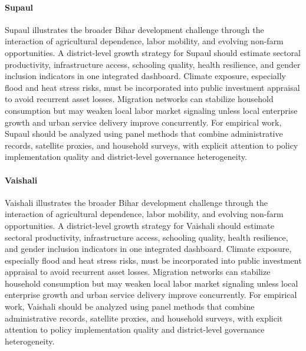 \documentclass[preprint,12pt]{elsarticle}
\begin{document}
\paragraph{Supaul} Supaul illustrates the broader Bihar development challenge through the interaction of agricultural dependence, labor mobility, and evolving non-farm opportunities. A district-level growth strategy for Supaul should estimate sectoral productivity, infrastructure access, schooling quality, health resilience, and gender inclusion indicators in one integrated dashboard. Climate exposure, especially flood and heat stress risks, must be incorporated into public investment appraisal to avoid recurrent asset losses. Migration networks can stabilize household consumption but may weaken local labor market signaling unless local enterprise growth and urban service delivery improve concurrently. For empirical work, Supaul should be analyzed using panel methods that combine administrative records, satellite proxies, and household surveys, with explicit attention to policy implementation quality and district-level governance heterogeneity.

\paragraph{Vaishali} Vaishali illustrates the broader Bihar development challenge through the interaction of agricultural dependence, labor mobility, and evolving non-farm opportunities. A district-level growth strategy for Vaishali should estimate sectoral productivity, infrastructure access, schooling quality, health resilience, and gender inclusion indicators in one integrated dashboard. Climate exposure, especially flood and heat stress risks, must be incorporated into public investment appraisal to avoid recurrent asset losses. Migration networks can stabilize household consumption but may weaken local labor market signaling unless local enterprise growth and urban service delivery improve concurrently. For empirical work, Vaishali should be analyzed using panel methods that combine administrative records, satellite proxies, and household surveys, with explicit attention to policy implementation quality and district-level governance heterogeneity.
\end{document}
